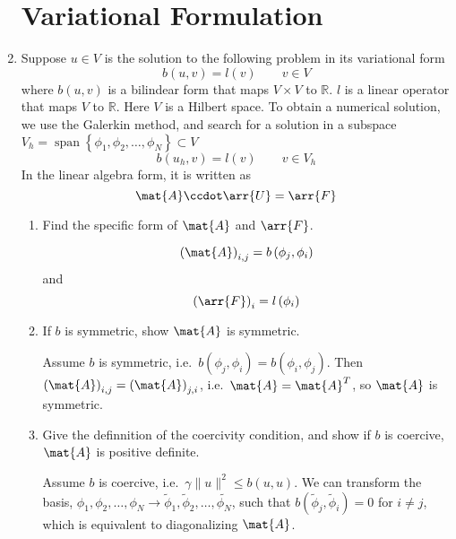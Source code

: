 \documentclass{article}
\newcommand\NoIndent[1]{%
  \begingroup
  \par
  \parshape0
  #1\par
  \endgroup
}
\DeclareMathOperator{\Span}{span}
\begin{document}
\begin{enumerate}
\NoIndent{\section{Variational Formulation}}

	\item Suppose $u \in V$ is the solution to the following problem in its variational form
		\begin{equation*}
			b(u,v) = l(v) \qquad v \in V
		\end{equation*}
		where $b(u,v)$ is a bilindear form that maps $V \times V$ to $\mathbb{R}$.
		$l$ is a linear operator that maps $V$ to $\mathbb{R}$.
		Here $V$ is a Hilbert space.
		To obtain a numerical solution, we use the Galerkin method, and search for a solution in a subspace
		$V_h = \Span\left\{\phi_1,\phi_2,\dots,\phi_N\right\} \subset V$
		\begin{equation*}
			b(u_h,v) = l(v) \qquad v \in V_h
		\end{equation*}
		In the linear algebra form, it is written as
		\begin{equation*}
			\mat{A}\ccdot\arr{U} = \arr{F}
		\end{equation*}
		\begin{enumerate}
			\item Find the specific form of $\mat{A}$ and $\arr{F}$.
\NoIndent{
	\begin{equation*}
		\left(\mat{A}\right)_{i,j} = b\left(\phi_j,\phi_i\right)
	\end{equation*}
	and
	\begin{equation*}
		\left(\arr{F}\right)_i = l\left(\phi_i\right)
	\end{equation*}
}
			\item If $b$ is symmetric, show $\mat{A}$ is symmetric.
\NoIndent{
	Assume $b$ is symmetric, i.e.\ $b\left(\phi_j,\phi_i\right) = b\left(\phi_i,\phi_j\right)$.
	Then $\left(\mat{A}\right)_{i,j} = \left(\mat{A}\right)_{j,i}$, i.e.\ $\mat{A} = \mat{A}^T$,
	so $\mat{A}$ is symmetric.
}
			\item Give the definnition of the coercivity condition,
				and show if $b$ is coercive, $\mat{A}$ is positive definite.
\NoIndent{
	Assume $b$ is coercive, i.e.\ $\gamma\|u\|^2 \leq b(u,u)$.
	We can transform the basis,
	$\phi_1,\phi_2,\dots,\phi_N \rightarrow \tilde{\phi}_1,\tilde{\phi}_2,\dots,\tilde{\phi_N}$,
	such that $b\left(\tilde{\phi}_j,\tilde{\phi}_i\right) = 0$ for $i \neq j$,
	which is equivalent to diagonalizing $\mat{A}$.
}
\end{enumerate}
\end{enumerate}
\end{document}
